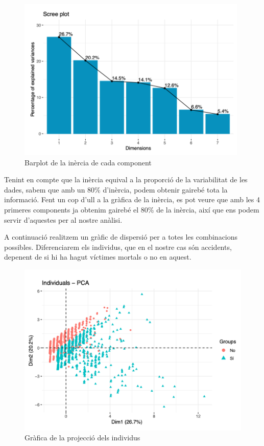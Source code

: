 \documentclass[11pt,longbibliography]{article}
\theoremstyle{definition}
\theoremstyle{remark}
\begin{document}
\begin{figure}[H]
\begin{center}
\includegraphics[width=11cm]{acp2}
\end{center}
\caption{Barplot de la inèrcia de cada component}
\label{fig:ACP2}
\end{figure}


Tenint en compte que la inèrcia equival a la proporció de la variabilitat de les dades, sabem que amb un 80\% d'inèrcia, podem obtenir gairebé tota la informació. Fent un cop d'ull a la gràfica de la inèrcia, es pot veure que amb les 4 primeres components ja obtenim gairebé el 80\% de la inèrcia, així que ens podem servir d'aquestes per al nostre anàlisi.



A continuació realitzem un gràfic de dispersió per a totes les combinacions possibles. Diferenciarem els individus, que en el nostre cas són accidents, depenent de si hi ha hagut víctimes mortals o no en aquest. 

\begin{figure}[H]
\begin{center}
\includegraphics[width=15cm]{acp3}
\end{center}
\caption{Gràfica de la projecció dels individus}
\label{fig:ACP3}
\end{figure}
\end{document}

